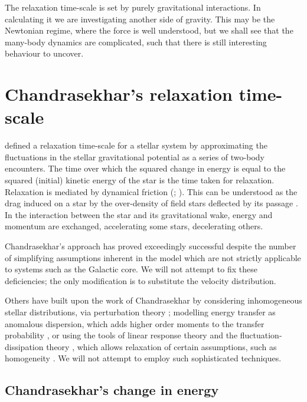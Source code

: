 The relaxation time-scale is set by purely gravitational interactions. In calculating it we are investigating another side of gravity. This may be the Newtonian regime, where the force is well understood, but we shall see that the many-body dynamics are complicated, such that there is still interesting behaviour to uncover.

\section{Chandrasekhar's relaxation time-scale}\label{sec:time-scale}

\citet[chapter 2]{Chandrasekhar1960} defined a relaxation time-scale for a stellar system by approximating the fluctuations in the stellar gravitational potential as a series of two-body encounters. The time over which the squared change in energy is equal to the squared (initial) kinetic energy of the star is the time taken for relaxation. Relaxation is mediated by dynamical friction (\citealt{Chandrasekhar1943a}; \citealt[section 1.2]{Binney2008}). This can be understood as the drag induced on a star by the over-density of field stars deflected by its passage \citep{Mulder1983}. In the interaction between the star and its gravitational wake, energy and momentum are exchanged, accelerating some stars, decelerating others.

Chandrasekhar's approach has proved exceedingly successful despite the number of simplifying assumptions inherent in the model which are not strictly applicable to systems such as the Galactic core. We will not attempt to fix these deficiencies; the only modification is to substitute the velocity distribution.

Others have built upon the work of Chandrasekhar by considering inhomogeneous stellar distributions, via perturbation theory \citep{Lynden-Bell1972,Tremaine1984,Weinberg1986}; modelling energy transfer as anomalous dispersion, which adds higher order moments to the transfer probability \citep{Bar-Or2012}, or using the tools of linear response theory and the fluctuation-dissipation theory \citep[chapter 7]{Landau1958}, which allows relaxation of certain assumptions, such as homogeneity \citep{Bekenstein1992,Maoz1993,Nelson1999}. We will not attempt to employ such sophisticated techniques.

\subsection{Chandrasekhar's change in energy}

